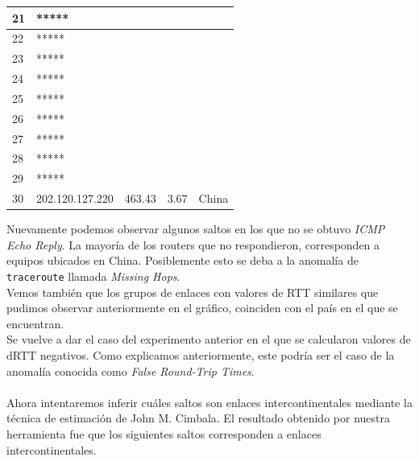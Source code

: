 \begin{center}
\begin{tabular}{| l | l | l | l | l | }
    21  	   & *****                    &             &             &                    \\ \hline
    22   	   & *****                    &             &             &                    \\ \hline
    23   	   & *****                    &             &             &                    \\ \hline
    24   	   & *****                    &             &             &                    \\ \hline
    25   	   & *****                    &             &             &                    \\ \hline
    26   	   & *****                    &             &             &                    \\ \hline
    27   	   & *****                    &             &             &                    \\ \hline
    28   	   & *****                    &             &             &                    \\ \hline
    29   	   & *****                    &             &             &                    \\ \hline
    30   	   & 202.120.127.220 & 463.43 & 3.67    & China          \\ \hline
 \end{tabular}
\end{center}

Nuevamente podemos observar algunos saltos en los que no se obtuvo \emph{ICMP Echo Reply}. La mayoría de los routers que no respondieron, corresponden a equipos ubicados en China. Posiblemente esto se deba a la anomalía de \texttt{traceroute} llamada \emph{Missing Hops}.
\\
Vemos también que los grupos de enlaces con valores de RTT similares que pudimos observar anteriormente en el gráfico, coinciden con el país en el que se encuentran.
\\
Se vuelve a dar el caso del experimento anterior en el que se calcularon valores de dRTT negativos. Como explicamos anteriormente, este podría ser el caso de la anomalía conocida como \emph{False Round-Trip Times}.    
\\\\
Ahora intentaremos inferir cuáles saltos son enlaces intercontinentales mediante la técnica de estimación de John M. Cimbala.
El resultado obtenido por nuestra herramienta fue que los siguientes saltos corresponden a enlaces intercontinentales.

